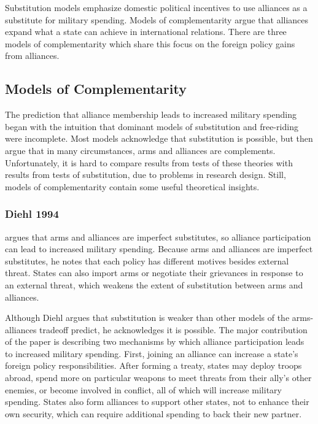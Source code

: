 \documentclass[12pt]{article}
\begin{document}
Substitution models emphasize domestic political incentives to use alliances as a substitute for military spending.  
Models of complementarity argue that alliances expand what a state can achieve in international relations. 
There are three models of complementarity which share this focus on the foreign policy gains from alliances. 



\subsection{Models of Complementarity} 


The prediction that alliance membership leads to increased military spending began with the intuition that dominant models of substitution and free-riding were incomplete. 
Most models acknowledge that substitution is possible, but then argue that in many circumstances, arms and alliances are complements. 
Unfortunately, it is hard to compare results from tests of these theories with results from tests of substitution, due to problems in research design. 
Still, models of complementarity contain some useful theoretical insights. 


\subsubsection{Diehl 1994}


\citet{Diehl1994} argues that arms and alliances are imperfect substitutes, so alliance participation can lead to increased military spending. 
Because arms and alliances are imperfect substitutes, he notes that each policy has different motives besides external threat. 
States can also import arms or negotiate their grievances in response to an external threat, which weakens the extent of substitution between arms and alliances. 


Although Diehl argues that substitution is weaker than other models of the arms-alliances tradeoff predict, he acknowledges it is possible.
The major contribution of the paper is describing two mechanisms by which alliance participation leads to increased military spending. 
First, joining an alliance can increase a state's foreign policy responsibilities. 
After forming a treaty, states may deploy troops abroad, spend more on particular weapons to meet threats from their ally's other enemies, or become involved in conflict, all of which will increase military spending. 
States also form alliances to support other states, not to enhance their own security, which can require additional spending to back their new partner. 
\end{document}

